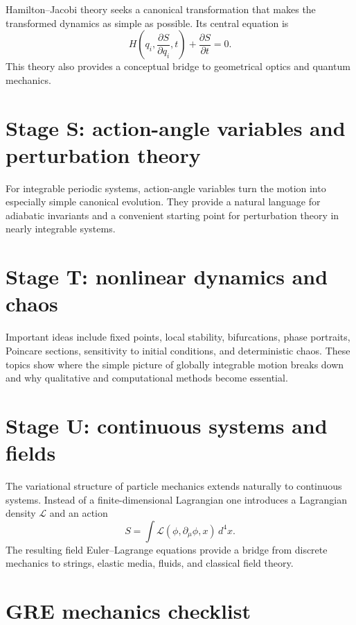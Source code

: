 Hamilton--Jacobi theory seeks a canonical transformation that makes the transformed dynamics as
simple as possible.  Its central equation is
\[
H\left(q_i,\frac{\partial S}{\partial q_i},t\right)
+\frac{\partial S}{\partial t}=0.
\]
This theory also provides a conceptual bridge to geometrical optics and quantum mechanics.

\section{Stage S: action-angle variables and perturbation theory}

For integrable periodic systems, action-angle variables turn the motion into especially simple
canonical evolution.  They provide a natural language for adiabatic invariants and a convenient
starting point for perturbation theory in nearly integrable systems.

\section{Stage T: nonlinear dynamics and chaos}

Important ideas include fixed points, local stability, bifurcations, phase portraits, Poincare
sections, sensitivity to initial conditions, and deterministic chaos.  These topics show where the
simple picture of globally integrable motion breaks down and why qualitative and computational
methods become essential.

\section{Stage U: continuous systems and fields}

The variational structure of particle mechanics extends naturally to continuous systems.  Instead
of a finite-dimensional Lagrangian one introduces a Lagrangian density $\mathcal L$ and an action
\[
S=\int \mathcal L(\phi,\partial_\mu\phi,x)\,d^4x.
\]
The resulting field Euler--Lagrange equations provide a bridge from discrete mechanics to strings,
elastic media, fluids, and classical field theory.

\section{GRE mechanics checklist}

